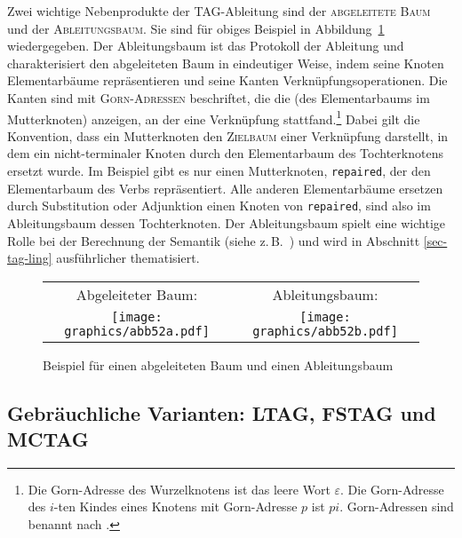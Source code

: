Zwei wichtige Nebenprodukte der TAG-Ableitung sind der \textsc{abgeleitete Baum} und der \textsc{Ableitungsbaum}. Sie sind für obiges Beispiel in Abbildung~\ref{fig-TAG-bsp2} wiedergegeben. Der Ableitungsbaum ist das Protokoll der Ableitung und charakterisiert den abgeleiteten Baum in eindeutiger Weise, indem seine Knoten Elementarbäume repräsentieren und seine Kanten Verknüpfungsoperationen. Die Kanten sind mit \textsc{Gorn-Adressen} beschriftet, die die  (des Elementarbaums im Mutterknoten) anzeigen, an der eine Verknüpfung stattfand.\footnote{Die Gorn-Adresse des Wurzelknotens ist das leere Wort $\varepsilon$. Die Gorn-Adresse des $i$-ten Kindes eines Knotens mit Gorn-Adresse $p$ ist $pi$. Gorn-Adressen sind benannt nach \cite{Gorn:67}.} Dabei gilt die Konvention, dass ein Mutterknoten den \textsc{Zielbaum} einer Verknüpfung darstellt, in dem ein nicht-terminaler Knoten durch den Elementarbaum des Tochterknotens ersetzt wurde. Im Beispiel gibt es nur einen Mutterknoten, {\tt repaired}, der den Elementarbaum des Verbs repräsentiert. Alle anderen Elementarbäume ersetzen durch Substitution oder Adjunktion einen Knoten von {\tt repaired}, sind also im Ableitungsbaum dessen Tochterknoten. Der Ableitungsbaum spielt eine wichtige Rolle bei der Berechnung der Semantik (siehe z.\,B.\ \citealt{Kallmeyer:Joshi:03,Kallmeyer:Romero:08}) und wird in Abschnitt \ref{sec-tag-ling} ausführlicher thematisiert.

\begin{figure}[t]
\centering
\begin{tabular}{cc}
Abgeleiteter Baum:\hspace*{3em} & Ableitungsbaum:\hspace*{4em} \\[2ex]
\begin{minipage}{17em}
\hspace{-1.5em}
\texttt{[image: graphics/abb52a.pdf]}
\end{minipage}
&
\hspace{-2em}
\texttt{[image: graphics/abb52b.pdf]}
\end{tabular}
\caption{\label{fig-TAG-bsp2}Beispiel für einen abgeleiteten Baum und einen Ableitungsbaum}
\end{figure}

\subsection{Gebräuchliche Varianten: LTAG, FSTAG und MCTAG}

